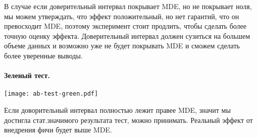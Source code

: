 \documentclass[../handbook.tex]{subfiles}
\begin{document}
В случае если доверительный интервал покрывает MDE, но не покрывает ноля, мы
можем утверждать, что эффект положительный, но нет гарантий, что он превосходит
MDE, поэтому эксперимент стоит продлить, чтобы сделать более точную оценку
эффекта. Доверительный интервал должен сузиться на большем объеме данных и
возможно уже не будет покрывать MDE и сможем сделать более уверенные выводы.

\paragraph{Зеленый тест.}
\begin{marginfigure}
    \texttt{[image: ab-test-green.pdf]}
\end{marginfigure}
Если доворительный интервал полностью лежит правее MDE, значит мы достигла стат.значимого результата тест, можно принимать. Реальный эффект от внедрения фичи будет выше MDE.
\end{document}
